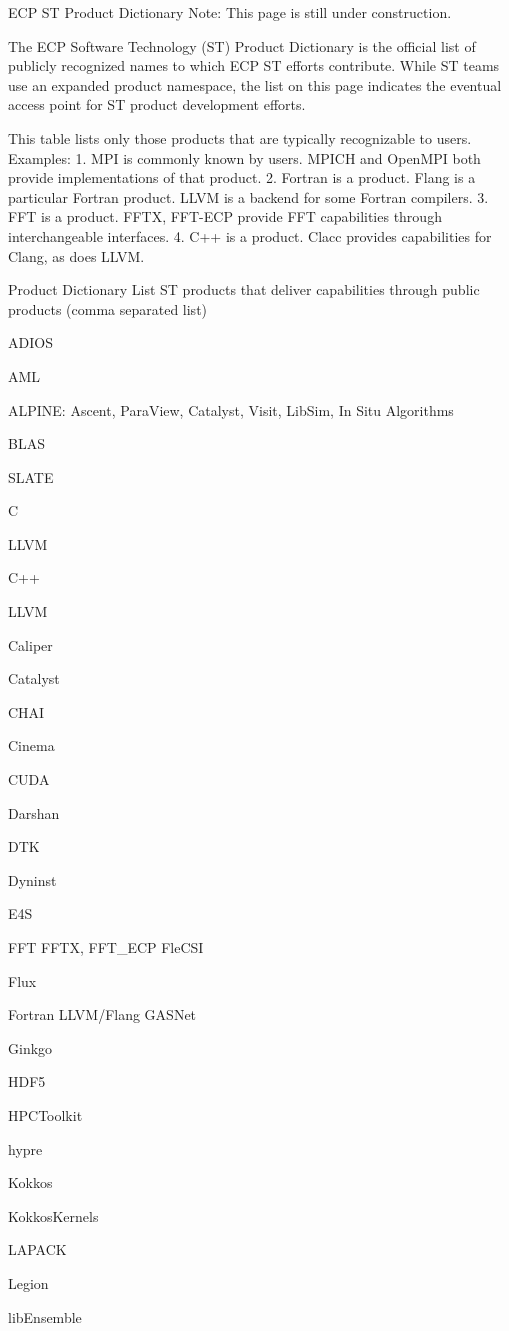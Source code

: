 ECP ST Product Dictionary
Note: This page is still under construction.

The ECP Software Technology (ST) Product Dictionary is the official list of publicly recognized 
names to which ECP ST efforts contribute.  While ST teams use an expanded product 
namespace, the list on this page indicates the eventual access point for ST product development 
efforts.

This table lists only those products that are typically recognizable to users. Examples:
1.	MPI is commonly known by users. MPICH and OpenMPI both provide implementations 
of that product.
2.	Fortran is a product. Flang is a particular Fortran product. LLVM is a backend for some 
Fortran compilers.
3.	FFT is a product. FFTX, FFT-ECP provide FFT capabilities through interchangeable 
interfaces. 
4.	C++ is a product. Clacc provides capabilities for Clang, as does LLVM.

Product 
Dictionary 
List
ST products that deliver capabilities through public products 
(comma separated list)

ADIOS

AML

ALPINE: Ascent, ParaView, Catalyst, Visit, LibSim, In Situ Algorithms

BLAS

SLATE

C

LLVM

C++

LLVM

Caliper

Catalyst

CHAI

Cinema

CUDA

Darshan

DTK

Dyninst

E4S

FFT
FFTX, FFT\_ECP
FleCSI

Flux

Fortran
LLVM/Flang
GASNet

Ginkgo

HDF5

HPCToolkit

hypre

Kokkos

KokkosKernels

LAPACK

Legion

libEnsemble

